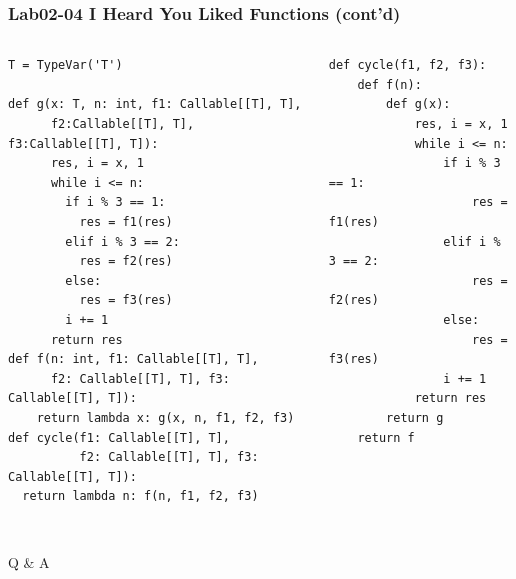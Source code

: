 \documentclass[aspectratio=169]{beamer}
\begin{document}
\begin{frame}[fragile]
\frametitle{Lab02-04 I Heard You Liked Functions (cont'd)}

\vspace{-5mm}

\scriptsize{
\begin{columns}
\begin{column}{0.5\textwidth}
\begin{verbatim}
T = TypeVar('T')

def g(x: T, n: int, f1: Callable[[T], T], 
      f2:Callable[[T], T], f3:Callable[[T], T]):
      res, i = x, 1
      while i <= n:
        if i % 3 == 1:
          res = f1(res)
        elif i % 3 == 2:
          res = f2(res)
        else:
          res = f3(res)
        i += 1
      return res
def f(n: int, f1: Callable[[T], T], 
      f2: Callable[[T], T], f3: Callable[[T], T]):
    return lambda x: g(x, n, f1, f2, f3)
def cycle(f1: Callable[[T], T], 
          f2: Callable[[T], T], f3: Callable[[T], T]):
  return lambda n: f(n, f1, f2, f3)
  
\end{verbatim}

\end{column}

\begin{column}{0.5\textwidth}  
\begin{verbatim}
def cycle(f1, f2, f3):
    def f(n):
        def g(x):
            res, i = x, 1
            while i <= n:
                if i % 3 == 1:
                    res = f1(res)
                elif i % 3 == 2:
                    res = f2(res)
                else:
                    res = f3(res)
                i += 1
            return res
        return g
    return f
\end{verbatim}

\end{column}
\end{columns}
}
\end{frame}


\begin{frame}

\begin{center}
\Huge Q \& A
\end{center}
    
\end{frame}
\end{document}
